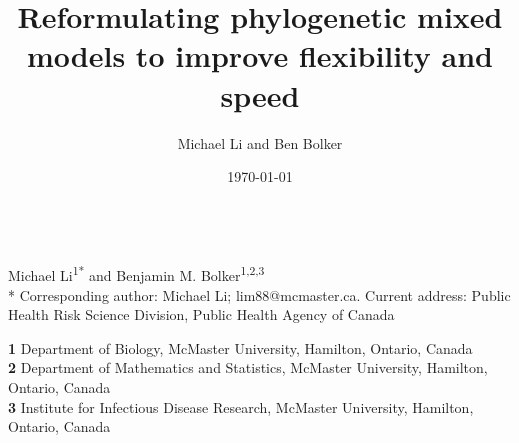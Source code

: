 \documentclass[12pt]{article}
\title{Reformulating phylogenetic mixed models to improve flexibility and speed}
\author{Michael Li and Ben Bolker}
\date{\today}
\date{}
\begin{document}
\newcommand{\dbic}{\ensuremath \Delta \textrm{BIC}}

\newcommand{\bmbhide}[1]{}
\newcommand{\bmb}[1]{{\color{blue} BB: #1}}


\renewcommand{\figurename}{Fig.}

\newcommand{\mli}[1]{{\color{red} ML: #1}}

\newcommand{\add}[1]{{\color{blue} ADD: #1}}


\newcommand{\pkg}[1]{{\tt #1}}
\newcommand{\code}[1]{{\tt #1}}

\newcommand{\plmefour}{phyloglmm/lme4}
\newcommand{\pgTMB}{phyloglmm/glmmTMB}
\newcommand{\phyvar}{\sigma} %
\newcommand{\phyv}[1]{\ensuremath{\phyvar^2_{\mathrm{phy}_\mathrm{#1}}}}
\newcommand{\phys}[1]{\ensuremath{\phyvar_{\mathrm{phy}_\mathrm{#1}}}}
\newcommand{\bphys}[1]{\ensuremath{{\bf b}_{\mathrm{phy}_{\mathrm{#1}}}}}
\newcommand{\bsps}[1]{\ensuremath{{\bf b}_{\mathrm{sp}_{\mathrm{#1}}}}}
\linenumbers





\begin{center}
{\Large
\textbf{} %
}
\\
\vspace{2pt}
Michael Li\textsuperscript{1*} and Benjamin M. Bolker\textsuperscript{1,2,3}
\\
\vspace{2pt}
* Corresponding author: Michael Li; lim88@mcmaster.ca. Current address: Public Health Risk Science Division, Public Health Agency of Canada 
\end{center}
\vspace{5pt}
\textbf{1} Department of Biology, McMaster University, Hamilton, Ontario, Canada
\\
\textbf{2} Department of Mathematics and Statistics, McMaster University, Hamilton, Ontario, Canada
\\
\textbf{3} Institute for Infectious Disease Research, McMaster University, Hamilton, Ontario, Canada
\\
\bigskip
\end{document}
